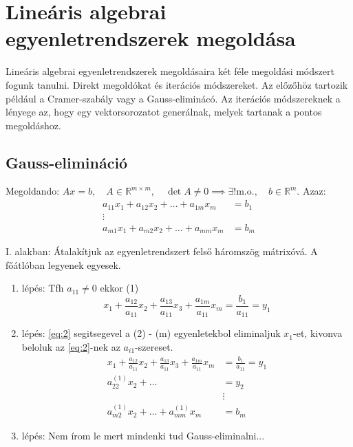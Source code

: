 \chapter{Lineáris algebrai egyenletrendszerek megoldása}
Lineáris algebrai egyenletrendszerek megoldásaira két féle megoldási módszert fogunk tanulni. Direkt megoldókat és iterációs módszereket. Az előzőhöz tartozik például a Cramer-szabály vagy a Gauss-eliminácó. Az iterációs módszereknek a lényege az, hogy egy vektorsorozatot generálnak, melyek tartanak a pontos megoldáshoz.

\section{Gauss-elimináció}
Megoldando: $Ax = b, \quad A \in \mathbb{R}^{m \times m}, \quad \det A \neq 0 \implies \exists! \text{m.o.}, \quad b \in \mathbb{R}^{m}$.
Azaz:
\begin{align*}
    a_{11}x_{1} + a_{12}x_{2} + \dots + a_{1m}x_{m} & = b_{1} \\
    \vdots & \\
    a_{m 1}x_{1} + a_{m 2}x_{2} + \dots + a_{m m}x_{m} & = b_{m}
\end{align*}

I. alakban: Átalakítjuk az egyenletrendszert felső háromszög mátrixóvá. A főátlóban legyenek egyesek.

\begin{enumerate}
    \item lépés: Tfh $a_{11} \neq 0$ ekkor (1)
$$x_{1} + \frac{a_{12}}{a_{11}}x_{2} + \frac{a_{13}}{a_{11}}x_{3} + \frac{a_{1m}}{a_{11}}x_{m} = \frac{b_{1}}{a_{11}} = y_{1}$$

    \item lépés: \ref{eq:2} segitsegevel a (2) - (m) egyenletekbol eliminaljuk $x_{1}$-et, kivonva beloluk az \ref{eq:2}-nek az $a_{i 1}$-szereset.
    \begin{align*}
    x_{1} + \frac{a_{12}}{a_{11}}x_{2} + \frac{a_{13}}{a_{11}}x_{3} + \frac{a_{1m}}{a_{11}}x_{m} & =  \frac{b_{1}}{a_{11}} = y_{1} \\
        a_{22}^{(1)}x_{2}  + \dots   & =  y_{2} \\
         & \vdots \\
     a_{m 2}^{(1)}x_{2}  +  \dots + a_{m m}^{(1)}x_{m} & = b_{m}
    \end{align*}
    
    \item lépés: Nem írom le mert mindenki tud Gauss-eliminalni...

\end{enumerate}

